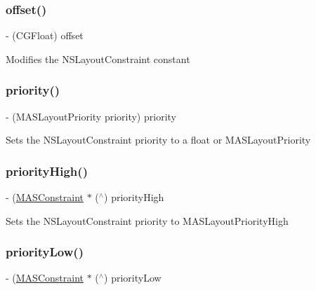 \subsubsection{\texorpdfstring{offset()}{offset()}}
{\footnotesize\ttfamily -\/ (C\+G\+Float) offset \begin{DoxyParamCaption}{ }\end{DoxyParamCaption}}

Modifies the N\+S\+Layout\+Constraint constant \mbox{\label{interface_m_a_s_constraint_a5a43d321e7b289e10568b5c458f8e97d}} 
\subsubsection{\texorpdfstring{priority()}{priority()}}
{\footnotesize\ttfamily -\/ (M\+A\+S\+Layout\+Priority priority) priority \begin{DoxyParamCaption}{ }\end{DoxyParamCaption}}

Sets the N\+S\+Layout\+Constraint priority to a float or M\+A\+S\+Layout\+Priority \mbox{\label{interface_m_a_s_constraint_a1f9bd3756b95b21a3bda2f71b8ba7639}} 
\subsubsection{\texorpdfstring{priority\+High()}{priorityHigh()}}
{\footnotesize\ttfamily -\/ (\mbox{\hyperlink{interface_m_a_s_constraint}{M\+A\+S\+Constraint}} $\ast$ ($^\wedge$) priority\+High \begin{DoxyParamCaption}{ }\end{DoxyParamCaption}}

Sets the N\+S\+Layout\+Constraint priority to M\+A\+S\+Layout\+Priority\+High \mbox{\label{interface_m_a_s_constraint_a0da58cfaf6c9ae2ee86241a780170122}} 
\subsubsection{\texorpdfstring{priority\+Low()}{priorityLow()}}
{\footnotesize\ttfamily -\/ (\mbox{\hyperlink{interface_m_a_s_constraint}{M\+A\+S\+Constraint}} $\ast$ ($^\wedge$) priority\+Low \begin{DoxyParamCaption}{ }\end{DoxyParamCaption}}

